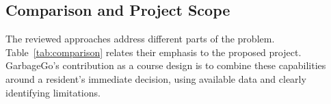 \subsection{Comparison and Project Scope}
The reviewed approaches address different parts of the problem. Table~\ref{tab:comparison} relates their emphasis to the proposed project. GarbageGo's contribution as a course design is to combine these capabilities around a resident's immediate decision, using available data and clearly identifying limitations.


